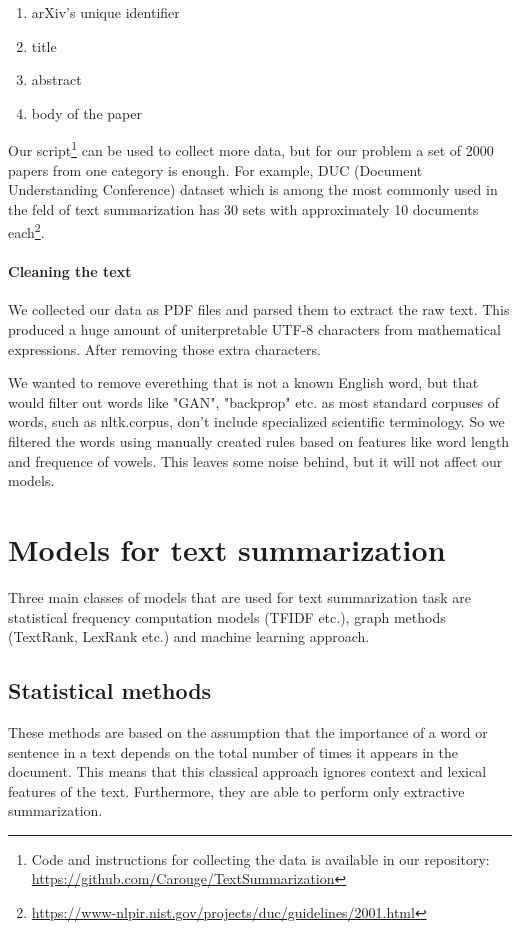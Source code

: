 \documentclass[sigplan]{acmart}
\begin{document}
\begin{enumerate}
  \item arXiv's unique identifier
  \item title
  \item abstract
  \item body of the paper
\end{enumerate}

Our script\footnote{Code and instructions for collecting the data is available in our repository: \url{https://github.com/Carouge/TextSummarization}} can be used to collect more data, but for our problem a set of 2000 papers from one category is enough. For example, DUC (Document Understanding Conference) dataset which is among the most commonly used in the feld of text summarization has 30 sets with approximately 10 documents each\footnote{\url{https://www-nlpir.nist.gov/projects/duc/guidelines/2001.html}}.

\paragraph{Cleaning the text} We collected our data as PDF files and parsed them to extract the raw text. This produced a huge amount of uniterpretable UTF-8 characters from mathematical expressions. After removing those extra characters.

We wanted to remove everething that is not a known English word, but that would filter out words like "GAN", "backprop" etc. as most standard corpuses of words, such as nltk.corpus, don't include specialized scientific terminology. So we filtered the words using manually created rules based on features like word length and frequence of vowels. This leaves some noise behind, but it will not affect our models.

\section{Models for text summarization}

Three main classes of models that are used for text summarization task are statistical frequency computation models (TFIDF etc.), graph methods (TextRank, LexRank etc.) and machine learning approach.

\subsection{Statistical methods}

These methods are based on the assumption that the importance of a word or sentence in a text depends on the total number of times it appears in the document. This means that this classical approach ignores context and lexical features of the text. Furthermore, they are able to perform only extractive summarization.
\end{document}
